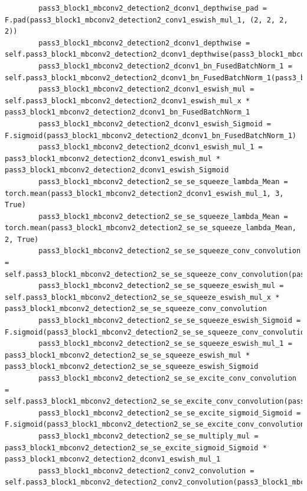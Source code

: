 \documentclass{fisatprojectfinal}
\begin{document}
\begin{appendices}
\begin{lstlisting}
        pass3_block1_mbconv2_detection2_dconv1_depthwise_pad = F.pad(pass3_block1_mbconv2_detection2_conv1_eswish_mul_1, (2, 2, 2, 2))
        pass3_block1_mbconv2_detection2_dconv1_depthwise = self.pass3_block1_mbconv2_detection2_dconv1_depthwise(pass3_block1_mbconv2_detection2_dconv1_depthwise_pad)
        pass3_block1_mbconv2_detection2_dconv1_bn_FusedBatchNorm_1 = self.pass3_block1_mbconv2_detection2_dconv1_bn_FusedBatchNorm_1(pass3_block1_mbconv2_detection2_dconv1_depthwise)
        pass3_block1_mbconv2_detection2_dconv1_eswish_mul = self.pass3_block1_mbconv2_detection2_dconv1_eswish_mul_x * pass3_block1_mbconv2_detection2_dconv1_bn_FusedBatchNorm_1
        pass3_block1_mbconv2_detection2_dconv1_eswish_Sigmoid = F.sigmoid(pass3_block1_mbconv2_detection2_dconv1_bn_FusedBatchNorm_1)
        pass3_block1_mbconv2_detection2_dconv1_eswish_mul_1 = pass3_block1_mbconv2_detection2_dconv1_eswish_mul * pass3_block1_mbconv2_detection2_dconv1_eswish_Sigmoid
        pass3_block1_mbconv2_detection2_se_se_squeeze_lambda_Mean = torch.mean(pass3_block1_mbconv2_detection2_dconv1_eswish_mul_1, 3, True)
        pass3_block1_mbconv2_detection2_se_se_squeeze_lambda_Mean = torch.mean(pass3_block1_mbconv2_detection2_se_se_squeeze_lambda_Mean, 2, True)
        pass3_block1_mbconv2_detection2_se_se_squeeze_conv_convolution = self.pass3_block1_mbconv2_detection2_se_se_squeeze_conv_convolution(pass3_block1_mbconv2_detection2_se_se_squeeze_lambda_Mean)
        pass3_block1_mbconv2_detection2_se_se_squeeze_eswish_mul = self.pass3_block1_mbconv2_detection2_se_se_squeeze_eswish_mul_x * pass3_block1_mbconv2_detection2_se_se_squeeze_conv_convolution
        pass3_block1_mbconv2_detection2_se_se_squeeze_eswish_Sigmoid = F.sigmoid(pass3_block1_mbconv2_detection2_se_se_squeeze_conv_convolution)
        pass3_block1_mbconv2_detection2_se_se_squeeze_eswish_mul_1 = pass3_block1_mbconv2_detection2_se_se_squeeze_eswish_mul * pass3_block1_mbconv2_detection2_se_se_squeeze_eswish_Sigmoid
        pass3_block1_mbconv2_detection2_se_se_excite_conv_convolution = self.pass3_block1_mbconv2_detection2_se_se_excite_conv_convolution(pass3_block1_mbconv2_detection2_se_se_squeeze_eswish_mul_1)
        pass3_block1_mbconv2_detection2_se_se_excite_sigmoid_Sigmoid = F.sigmoid(pass3_block1_mbconv2_detection2_se_se_excite_conv_convolution)
        pass3_block1_mbconv2_detection2_se_se_multiply_mul = pass3_block1_mbconv2_detection2_se_se_excite_sigmoid_Sigmoid * pass3_block1_mbconv2_detection2_dconv1_eswish_mul_1
        pass3_block1_mbconv2_detection2_conv2_convolution = self.pass3_block1_mbconv2_detection2_conv2_convolution(pass3_block1_mbconv2_detection2_se_se_multiply_mul)

\end{lstlisting}
\end{appendices}
\end{document}
